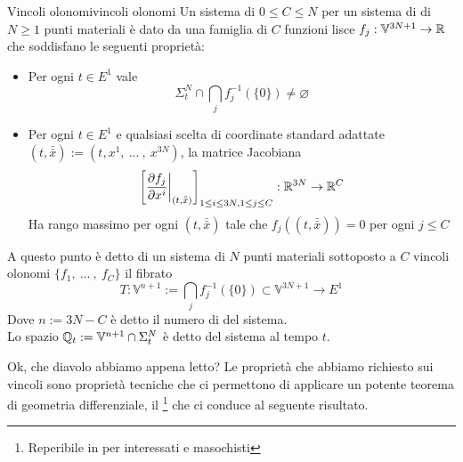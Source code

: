 \documentclass[openany]{book}
\renewcommand\V{\mathbb{V}}
\begin{document}
\begin{definition}{Vincoli olonomi}{vincoli olonomi}
    Un sistema di $0\le C\le N$  per un sistema di di $N\ge 1$ punti materiali è dato da una famiglia di $C$ funzioni lisce $f_j : \V^{3N+1}\to\R$ che soddisfano le seguenti proprietà:\begin{itemize}
        \item Per ogni $t \in E^1$ vale 
        \[ \Sigma_t^N \cap \bigcap_j f_j^{-1}(\{0\}) \neq \varnothing\]
        \item Per ogni $t \in E^1$ e qualsiasi scelta di coordinate standard adattate $(t,\bar{\bar x}) := (t,x^1,\ ...\ ,\ x^{3N})$, la matrice Jacobiana 
        \[ \left[ \frac{\partial f_j}{\partial x^i} \bigg|_{(t,\bar{\bar x})} \right]_{1\le i\le 3N,1\le j\le C} : \mathbb{R}^{3N}\to \mathbb{R}^C \]
        Ha rango massimo per ogni $(t,\bar{\bar x})$ tale che $f_j((t,\bar{\bar x})) = 0$ per ogni $j\le C$
    \end{itemize}
    A questo punto è detto  di un sistema di $N$ punti materiali sottoposto a $C$ vincoli olonomi $\{f_1,\ ...\ ,\ f_C\}$ il fibrato 
    \[ T: \V^{n+1}:= \bigcap_j f_j^{-1}(\{0\}) \subset \V^{3N+1} \to E^1 \]
    Dove $n := 3N - C$ è detto il numero di  del sistema.\\
    Lo spazio $\Q_t := \V^{n+1}\cap \Sigma_t^N$ è detto  del sistema al tempo $t$.
\end{definition}

Ok, che diavolo abbiamo appena letto? Le proprietà che abbiamo richiesto sui vincoli sono proprietà tecniche che ci permettono di applicare un potente teorema di geometria differenziale, il \footnote{Reperibile in \cite{Moretti2024} per interessati e masochisti} che ci conduce al seguente risultato.
\end{document}

